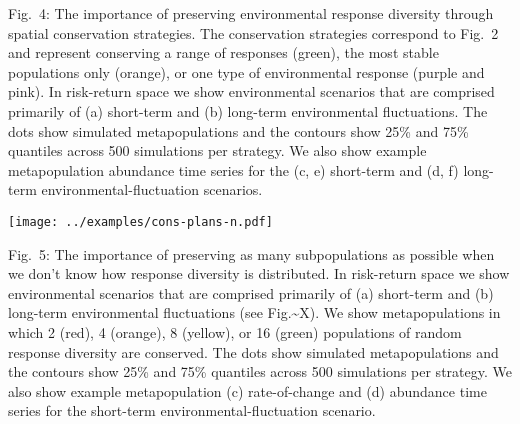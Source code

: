 Fig.~4: The importance of preserving environmental response diversity through spatial conservation strategies. The conservation strategies correspond to Fig.~2 and represent conserving a range of responses (green), the most stable populations only (orange), or one type of environmental response (purple and pink). In risk-return space we show environmental scenarios that are comprised primarily of (a) short-term and (b) long-term environmental fluctuations. The dots show simulated metapopulations and the contours show 25\% and 75\% quantiles across 500 simulations per strategy. We also show example metapopulation abundance time series for the (c, e) short-term and (d, f) long-term environmental-fluctuation scenarios.

\clearpage
\texttt{[image: ../examples/cons-plans-n.pdf]}

Fig.~5: The importance of preserving as many subpopulations as possible when we don't know how response diversity is distributed. In risk-return space we show environmental scenarios that are comprised primarily of (a) short-term and (b) long-term environmental fluctuations (see Fig.\textasciitilde{}X). We show metapopulations in which 2 (red), 4 (orange), 8 (yellow), or 16 (green) populations of random response diversity are conserved. The dots show simulated metapopulations and the contours show 25\% and 75\% quantiles across 500 simulations per strategy. We also show example metapopulation (c) rate-of-change and (d) abundance time series for the short-term environmental-fluctuation scenario.
